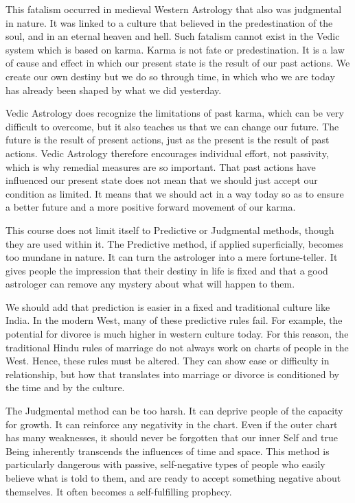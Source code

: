  

This fatalism occurred in medieval Western Astrology that also was judgmental in nature.  It was linked to a culture that believed in the predestination of the soul, and in an eternal heaven and hell. Such fatalism cannot exist in the Vedic system which is based on karma. Karma is not fate or predestination. It is a law of cause and effect in which our present state is the result of our past actions. We create our own destiny but we do so through time, in which who we are today has already been shaped by what we did yesterday.

 

Vedic Astrology does recognize the limitations of past karma, which can be very difficult to overcome, but it also teaches us that we can change our future. The future is the result of present actions, just as the present is the result of past actions. Vedic Astrology therefore encourages individual effort, not passivity, which is why remedial measures are so important. That past actions have influenced our present state does not mean that we should just accept our condition as limited. It means that we should act in a way today so as to ensure a better future and a more positive forward movement of our karma.

 

This course does not limit itself to Predictive or Judgmental methods, though they are used within it. The Predictive method, if applied superficially, becomes too mundane in nature. It can turn the astrologer into a mere fortune-teller. It gives people the impression that their destiny in life is fixed and that a good astrologer can remove any mystery about what will happen to them.

 

We should add that prediction is easier in a fixed and traditional culture like India. In the modern West, many of these predictive rules fail. For example, the potential for divorce is much higher in western culture today. For this reason, the traditional Hindu rules of marriage do not always work on charts of people in the West. Hence, these rules must be altered. They can show ease or difficulty in relationship, but how that translates into marriage or divorce is conditioned by the time and by the culture.

 

The Judgmental method can be too harsh. It can deprive people of the capacity for growth. It can reinforce any negativity in the chart. Even if the outer chart has many weaknesses, it should never be forgotten that our inner Self and true Being inherently transcends the influences of time and space. This method is particularly dangerous with passive, self-negative types of people who easily believe what is told to them, and are ready to accept something negative about themselves. It often becomes a self-fulfilling prophecy.

